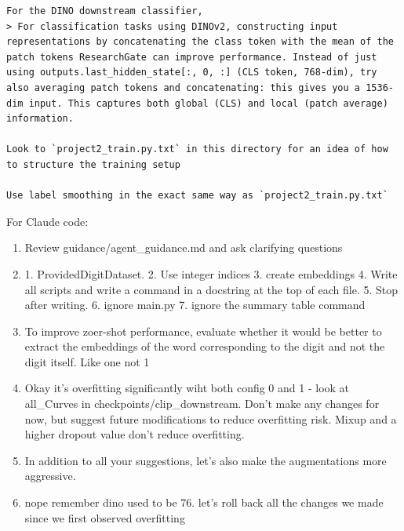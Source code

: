 \documentclass[11pt]{article}
\begin{document}
\begin{enumerate}
\begin{verbatim}
For the DINO downstream classifier, 
> For classification tasks using DINOv2, constructing input representations by concatenating the class token with the mean of the patch tokens ResearchGate can improve performance. Instead of just using outputs.last_hidden_state[:, 0, :] (CLS token, 768-dim), try also averaging patch tokens and concatenating: this gives you a 1536-dim input. This captures both global (CLS) and local (patch average) information.

Look to `project2_train.py.txt` in this directory for an idea of how to structure the training setup

Use label smoothing in the exact same way as `project2_train.py.txt`
\end{verbatim}

\end{enumerate}

For Claude code:
\begin{enumerate}
    \item Review guidance/agent\_guidance.md and ask clarifying questions
    \item 1. ProvidedDigitDataset. 2. Use integer indices 3. create embeddings 4. Write all scripts and write a command in a docstring at the top of each file. 5. Stop after writing. 6. ignore main.py 7. ignore the summary table command
    \item To improve zoer-shot performance, evaluate whether it would be better to extract the embeddings of the word corresponding to the digit and not the digit itself. Like one not 1   
    \item  Okay it's overfitting significantly wiht both config 0 and 1 - look at all\_Curves in checkpoints/clip\_downstream. Don't make any changes for now, but suggest future modifications to reduce overfitting risk. Mixup and a higher dropout value don't reduce       
  overfitting.       
\item         In addition to all your suggestions, let's also make the augmentations more aggressive.                                                                                   \item     nope remember dino used to be 76. let's roll back all the changes we made since we first observed overfitting                     

\end{enumerate}
\end{document}
